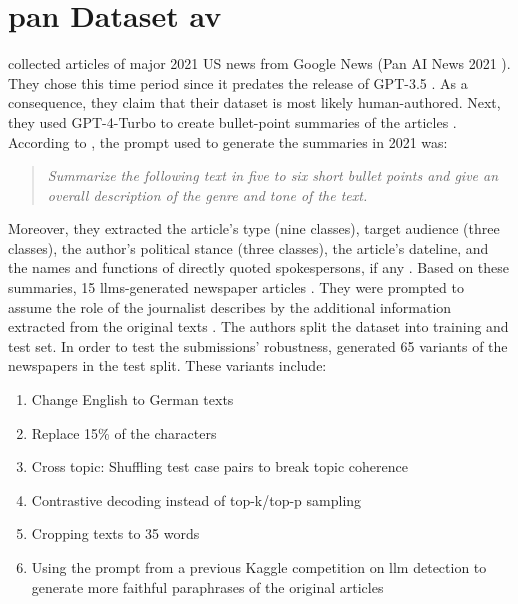 \section{\acs{pan} Dataset \ac{av}}
\label{sec:pan_dataset_authorship_verification}

\citet{ayele_overview_2024,bevendorff_overview_2024} collected articles of major 2021 US news from Google News (Pan AI News 2021 \citep{bevendorff_overview_2024}).
They chose this time period since it predates the release of GPT-3.5 \citep{bevendorff_overview_2024,ayele_overview_2024}.
As a consequence, they claim that their dataset is most likely human-authored.
Next, they used GPT-4-Turbo to create bullet-point summaries of the articles \citep{bevendorff_overview_2024,ayele_overview_2024}. 
According to \citet{bevendorff_overview_2024}, the prompt used to generate the summaries in 2021 was:
\begin{quote}
    \textit{Summarize the following text in five to six short bullet points and give an overall description
    of the genre and tone of the text.}
\end{quote}
Moreover, they extracted the article's type (nine classes), target audience (three classes), the author's political stance (three classes), the article's dateline, 
and the names and functions of directly quoted spokespersons, if any \citep{bevendorff_overview_2024}.
Based on these summaries, 15 \acp{llm}-generated newspaper articles \citep{ayele_overview_2024}.
They were prompted to assume the role of the journalist describes by the additional information extracted from the original texts \citep{bevendorff_overview_2024}.
The authors split the dataset into training and test set.
In order to test the submissions' robustness, \citet{ayele_overview_2024,bevendorff_overview_2024} generated 65 variants of the newspapers in the test split.
These variants include:
\begin{enumerate}
    \item Change English to German texts
    \item Replace 15\% of the characters
    \item Cross topic: Shuffling test case pairs to break topic coherence 
    \item Contrastive decoding instead of top-k/top-p sampling
    \item Cropping texts to 35 words
    \item Using the prompt from a previous Kaggle competition on \ac{llm} detection to generate more faithful paraphrases of the original articles
\end{enumerate}
